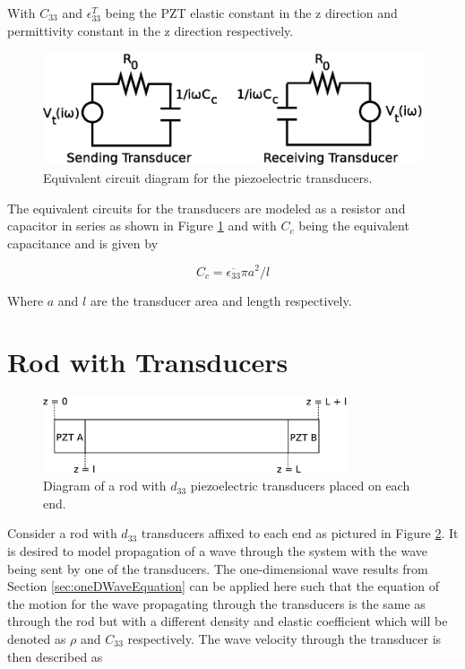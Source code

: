With $C_{33}$ and $\epsilon ^T_{33}$ being the PZT elastic constant in the z direction and permittivity constant in the z direction respectively.

\begin{figure}[ht!]
\centering
\includegraphics[width=1\textwidth]{eps_pics/trans_circ}
\caption{Equivalent circuit diagram for the piezoelectric transducers.
	 \label{fig:trans_circ}} 
\end{figure}


The equivalent circuits for the transducers are modeled as a resistor and capacitor in series as shown in Figure \ref{fig:trans_circ} and with $C_c$ being the equivalent capacitance and is given by

\begin{equation}
C_c = \overline{\epsilon_{33}} \pi a^2/l
\end{equation}

Where $a$ and $l$ are the transducer area and length respectively. 

\section{Rod with Transducers}
\label{sec:rodWithTrans}

\begin{figure}[ht!]
\centering
\includegraphics[width=0.8\textwidth]{eps_pics/rodTrans.eps}
\caption{Diagram of a rod with $d_{33}$ piezoelectric transducers placed on each end.
	 \label{fig:rodTrans}} 
\end{figure}

Consider a rod with $d_{33}$ transducers affixed to each end as pictured in Figure \ref{fig:rodTrans}. It is desired to model propagation of a wave through the system with the wave being sent by one of the transducers. The one-dimensional wave results from Section \ref{sec:oneDWaveEquation} can be applied here such that the equation of the motion for the wave propagating through the transducers is the same as through the rod but with a different density and elastic coefficient which will be denoted as $\rho$ and $C_{33}$ respectively. The wave velocity through the transducer is then described as

